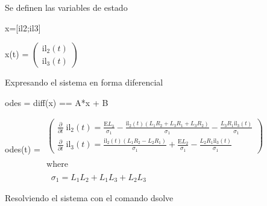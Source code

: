 \documentclass[10pt,a4paper]{article} %
\begin{document}
	\begin{par}
		\begin{flushleft}
			Se definen las variables de estado
		\end{flushleft}
	\end{par}
	
	\begin{matlabcode}
		x=[il2;il3]
	\end{matlabcode}
	\begin{matlabsymbolicoutput}
		x(t) = 
		$\displaystyle \left(\begin{array}{c}
		{\textrm{il}}_2 \left(t\right)\\
		{\textrm{il}}_3 \left(t\right)
		\end{array}\right)$
	\end{matlabsymbolicoutput}
	
	\begin{par}
		\begin{flushleft}
			Expresando el sistema en forma diferencial
		\end{flushleft}
	\end{par}
	
	\begin{matlabcode}
		odes = diff(x) ==  A*x + B
	\end{matlabcode}
	\begin{matlabsymbolicoutput}
		odes(t) = 
		$\displaystyle \begin{array}{l}
		\left(\begin{array}{c}
		\frac{\partial }{\partial t}\;{\textrm{il}}_2 \left(t\right)=\frac{\textrm{E} L_3 }{\sigma_1 }-\frac{{\textrm{il}}_2 \left(t\right) {\left(L_1  R_2 +L_3  R_1 +L_3  R_2 \right)}}{\sigma_1 }-\frac{L_3  R_1  {\textrm{il}}_3 \left(t\right)}{\sigma_1 }\\
		\frac{\partial }{\partial t}\;{\textrm{il}}_3 \left(t\right)=\frac{{\textrm{il}}_2 \left(t\right) {\left(L_1  R_2 -L_2  R_1 \right)}}{\sigma_1 }+\frac{\textrm{E} L_2 }{\sigma_1 }-\frac{L_2  R_1  {\textrm{il}}_3 \left(t\right)}{\sigma_1 }
		\end{array}\right)\\
		\mathrm{}\\
		\textrm{where}\\
		\mathrm{}\\
		\;\;\sigma_1 =L_1  L_2 +L_1  L_3 +L_2  L_3 
		\end{array}$
	\end{matlabsymbolicoutput}
	
	\begin{par}
		\begin{flushleft}
			Resolviendo el sistema con el comando dsolve
		\end{flushleft}
	\end{par}
	
\end{document}
